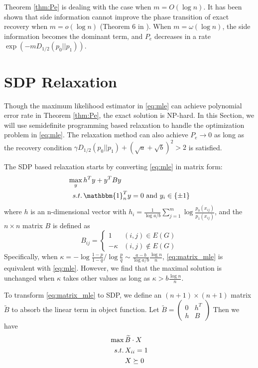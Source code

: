 \documentclass[conference]{IEEEtran}
\begin{document}
Theorem \ref{thm:Pe} is dealing with the case when $m=O(\log n)$. It has been shown
that side information cannot improve the phase transition of exact recovery when $m=o(\log n)$ (Theorem 6 in \cite{saad2018community}). When $m=\omega(\log n)$,
the side information becomes the dominant term, and $P_e$ decreases in a rate $\exp(-m D_{1/2}(p_0||p_1) )$.

\section{SDP Relaxation}
Though the maximum likelihood estimator in \eqref{eq:mle} can achieve polynomial
error rate in Theorem \ref{thm:Pe}, the exact solution is NP-hard. In this
Section, we will use semidefinite programming based relaxation to handle
the optimization problem in \eqref{eq:mle}. The relaxation method
can also achieve $P_e\to 0$ as long as the recovery condition
$\gamma D_{1/2}(p_0||p_1) + (\sqrt{a} + \sqrt{b})^2 > 2$ is satisfied.

The SDP based relaxation starts by converting \eqref{eq:mle} in matrix form:
\begin{align}
\max_{y}\, & h^T y + y^T B y \notag \\
s.t.\, & \mathbbm{1}_n^T y = 0 \text{ and } y_i \in \{\pm 1 \} \label{eq:matrix_mle}
\end{align}
where $h$ is an n-dimensional vector with $h_i = \frac{1}{\log a/b}\sum_{j=1}^m \log \frac{p_0(x_{ij})}{p_1(x_{ij})}$, and the $n\times n $ matrix $B$ is defined as
\begin{equation}
B_{ij} = \begin{cases}
1 & (i,j)\in E(G) \\
-\kappa & (i,j) \not\in E(G)
\end{cases}
\end{equation}
Specifically, when $\kappa = -\log\frac{1-p}{1-q} / \log\frac{p}{q} \sim \frac{a-b}{\log a/b}\frac{\log n}{n}$, \eqref{eq:matrix_mle} is equivalent with \eqref{eq:mle}. However, we find that
the maximal solution is unchanged when $\kappa$ takes other values as long as $\kappa > b\frac{\log n}{n}$.

To transform \eqref{eq:matrix_mle} to SDP, we define an $(n+1) \times (n+1)$ matrix $\widetilde{B}$
to absorb the linear term in object function.
Let $\tilde{B} = \begin{pmatrix} 0 & h^T \\ h & B \end{pmatrix}$
Then we have
\begin{align}
\max\, & \widetilde{B} \cdot X \notag \\
s.t.\,& X_{ii}=1 \notag \\
& X \succeq 0 \label{eq:sdp}
\end{align}
\end{document}
